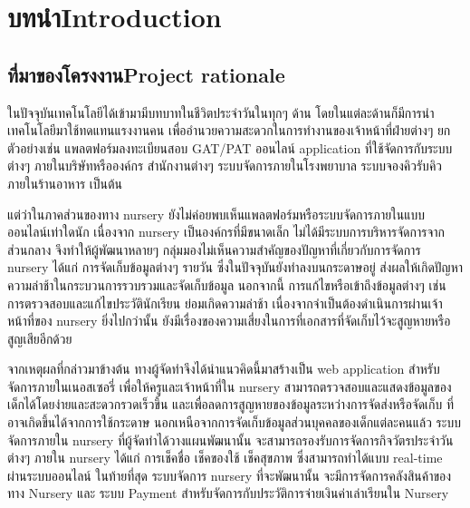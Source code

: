 \chapter{\ifcpe บทนำ\else Introduction\fi}

\section{\ifcpe ที่มาของโครงงาน\else Project rationale\fi}

ในปัจจุบันเทคโนโลยีได้เข้ามามีบทบาทในชีวิตประจําวันในทุกๆ ด้าน โดยในแต่ละด้านก็มีการนําเทคโนโลยีมาใช้ทดแทนแรงงานคน  เพื่ออํานวยความสะดวกในการทํางานของเจ้าหน้าที่ฝ่ายต่างๆ  ยกตัวอย่างเช่น แพลตฟอร์มลงทะเบียนสอบ GAT/PAT ออนไลน์ application ที่ใช้จัดการกับระบบต่างๆ ภายในบริษัทหรือองค์กร สำนักงานต่างๆ ระบบจัดการภายในโรงพยาบาล ระบบจองคิวรับคิวภายในร้านอาหาร เป็นต้น

แต่ว่าในภาคส่วนของทาง nursery ยังไม่ค่อยพบเห็นแพลตฟอร์มหรือระบบจัดการภายในแบบออนไลน์เท่าใดนัก
เนื่องจาก nursery เป็นองค์กรที่มีขนาดเล็ก ไม่ได้มีระบบการบริหารจัดการจากส่วนกลาง จึงทำให้ผู้พัฒนาหลายๆ กลุ่มมองไม่เห็นความสำคัญของปัญหาที่เกี่ยวกับการจัดการ nursery ได้แก่ การจัดเก็บข้อมูลต่างๆ รายวัน ซึ่งในปัจจุบันยังทำลงบนกระดาษอยู่ ส่งผลให้เกิดปัญหาความล่าช้าในกระบวนการรวบรวมและจัดเก็บข้อมูล
นอกจากนี้ การแก้ไขหรือเข้าถึงข้อมูลต่างๆ เช่น การตรวจสอบและแก้ไขประวัตินักเรียน ย่อมเกิดความล่าช้า เนื่องจากจำเป็นต้องดำเนินการผ่านเจ้าหน้าที่ของ nursery ยิ่งไปกว่านั้น ยังมีเรื่องของความเสี่ยงในการที่เอกสารที่จัดเก็บไว้จะสูญหายหรือสูญเสียอีกด้วย

จากเหตุผลที่กล่าวมาข้างต้น ทางผู้จัดทําจึงได้นำแนวคิดนี้มาสร้างเป็น web application 
สําหรับจัดการภายในเนอสเซอรี่ เพื่อให้ครูและเจ้าหน้าที่ใน nursery สามารถตรวจสอบและแสดงข้อมูลของเด็กได้โดยง่ายและสะดวกรวดเร็วขึ้น และเพื่อลดการสูญหายของข้อมูลระหว่างการจัดส่งหรือจัดเก็บ ที่อาจเกิดขึ้นได้จากการใช้กระดาษ
นอกเหนือจากการจัดเก็บข้อมูลส่วนบุคคลของเด็กแต่ละคนแล้ว ระบบจัดการภายใน nursery ที่ผู้จัดทำได้วางแผนพัฒนานั้น จะสามารถรองรับการจัดการกิจวัตรประจำวันต่างๆ ภายใน nursery ได้แก่ การเช็คชื่อ เช็คของใช้ เช็คสุขภาพ
ซึ่งสามารถทำได้แบบ real-time ผ่านระบบออนไลน์
ในท้ายที่สุด ระบบจัดการ nursery ที่จะพัฒนานั้น จะมีการจัดการคลังสินค้าของทาง Nursery และ ระบบ Payment สำหรับจัดการกับประวัติการจ่ายเงินค่าเล่าเรียนใน Nursery



